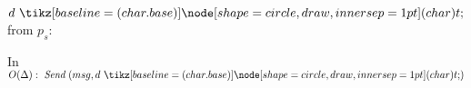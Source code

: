 \begin{bbox}[title={$\F_{\msf{sync-chan}(p_s, p_r, r, \Delta)}$}]

\OnInput {} $d \token$ from $p_s$:
	\begin{renumerate}
	\item In $O(\Delta): ~\Send (msg, d \token)$
	\end{renumerate}
\end{bbox}
